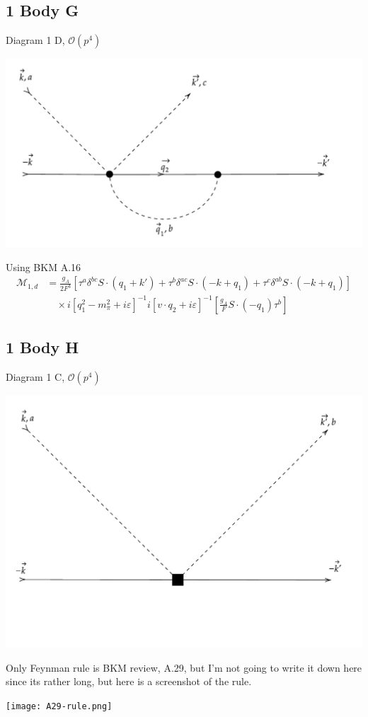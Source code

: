 \documentclass[11pt]{article}
\newcommand\mo{\mathcal{O}}
\newcommand\mm{\mathcal{M}}
\begin{document}
\subsection{1 Body G}
Diagram 1 D, $\mo(p^4)$
\begin{center}
    \includegraphics[scale=0.7]{1g.pdf}
\end{center}
Using BKM A.16
\begin{align}
    \mm_{1,d}&= \frac{g_A}{2F^3}  \left[ \tau^a \delta^{bc} S \cdot \left( q_1+k' \right)+ \tau^b \delta^{ac} S\cdot (-k+q_1) + \tau^c \delta^{ab} S\cdot(-k+q_1)\right]\nonumber\\
           &\quad\times i \left[ q_1^2 -m_{\pi}^2 +i \varepsilon \right]^{-1}
           i\left[v\cdot q_2 + i \varepsilon \right]^{-1}
           \left[ \frac{g_A}{F} S \cdot (-q_1) \tau^b\right]
\end{align}
\newpage
\subsection{1 Body H}
Diagram 1 C, $\mo(p^4)$
\begin{center}
    \includegraphics[scale=0.6]{1h.pdf}
\end{center}
Only Feynman rule is BKM review, A.29, but I'm not going to write it down here since its rather long, but here is a screenshot of the rule.
\begin{center}
    \texttt{[image: A29-rule.png]}
\end{center}
\newpage
\end{document}

